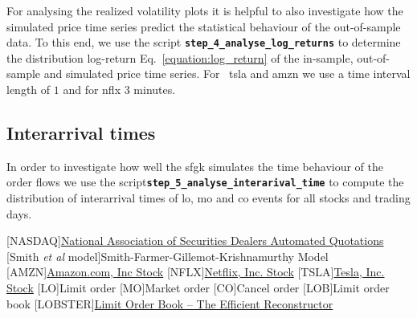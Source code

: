 \documentclass[11pt, a4paper]{thesis}  %
\begin{document}
For analysing the realized volatility plots it is helpful to also investigate how the simulated price time series predict the statistical behaviour of the out-of-sample data. To this end, we use the script {\bf \texttt{step\_4\_analyse\_log\_returns}} to determine the distribution log-return Eq.~\ref{equation:log_return} of the in-sample, out-of-sample and simulated price time series. For ~\ac{tsla} and \ac{amzn} we use a time interval length of $1$ and for \ac{nflx} $3$ minutes.

\subsection{Interarrival times} 

In order to investigate how well the \ac{sfgk} simulates the time behaviour of the order flows we use the script{\bf \texttt{step\_5\_analyse\_interarival\_time}} to compute the distribution of interarrival times of \ac{lo}, \ac{mo} and \ac{co} events for all stocks and trading days.

%
%



%
%

\begin{acronym}[ECU]
	[NASDAQ]{\href{https://www.nasdaq.com/}
	{National Association of Securities Dealers Automated Quotations}}
	[Smith {\it et al} model]{Smith-Farmer-Gillemot-Krishnamurthy Model~\cite{Farmer:2005:Model}}
	[AMZN]{\href{https://www.nasdaq.com/symbol/amzn/real-time}{Amazon.com, Inc Stock}}
	[NFLX]{\href{https://www.nasdaq.com/symbol/nflx/real-time}{Netflix, Inc. Stock}}
	[TSLA]{\href{https://www.nasdaq.com/symbol/tsla/real-time}{Tesla, Inc. Stock}}
	[LO]{Limit order}
	[MO]{Market order}
	[CO]{Cancel order}
	[LOB]{Limit order book}
	[LOBSTER]{\href{https://lobsterdata.com/}{Limit Order Book – The Efficient Reconstructor}}
\end{acronym}
\end{document}
